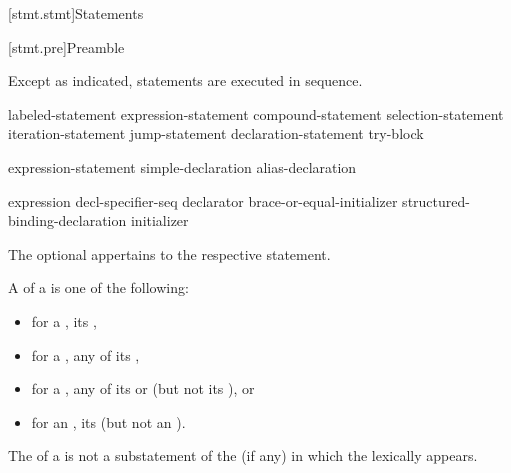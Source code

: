 [stmt.stmt]{Statements}%



[stmt.pre]{Preamble}

\pnum
Except as indicated, statements are executed in sequence.

\begin{bnf}
\br
    labeled-statement\br
     expression-statement\br
     compound-statement\br
     selection-statement\br
     iteration-statement\br
     jump-statement\br
    declaration-statement\br
     try-block
\end{bnf}

\begin{bnf}
\br
    expression-statement\br
    simple-declaration\br
    alias-declaration
\end{bnf}

\begin{bnf}
\br
    expression\br
     decl-specifier-seq declarator brace-or-equal-initializer\br
    structured-binding-declaration initializer
\end{bnf}

The optional  appertains to the respective statement.

\pnum
A  of a  is one of the following:
\begin{itemize}
\item
  for a , its ,
\item
  for a , any  of its ,
\item
  for a , any of its  or  (but not its ), or
\item
  for an , its  (but not an ).
\end{itemize}
\begin{note}
The  of a 
is not a substatement of the  (if any)
in which the  lexically appears.
\end{note}

